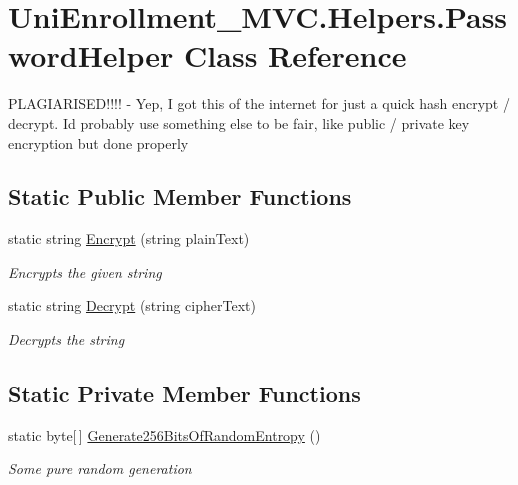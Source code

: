 \hypertarget{class_uni_enrollment___m_v_c_1_1_helpers_1_1_password_helper}{}\section{Uni\+Enrollment\+\_\+\+M\+V\+C.\+Helpers.\+Password\+Helper Class Reference}
\label{class_uni_enrollment___m_v_c_1_1_helpers_1_1_password_helper}


P\+L\+A\+G\+I\+A\+R\+I\+S\+E\+D!!!! -\/ Yep, I got this of the internet for just a quick hash encrypt / decrypt. I\textquotesingle{}d probably use something else to be fair, like public / private key encryption but done properly  


\subsection*{Static Public Member Functions}
\begin{DoxyCompactItemize}
\item 
static string \hyperlink{class_uni_enrollment___m_v_c_1_1_helpers_1_1_password_helper_a154520837901c0ba725be0d3ae4b5307}{Encrypt} (string plain\+Text)
\begin{DoxyCompactList}\small\item\em Encrypts the given string \end{DoxyCompactList}\item 
static string \hyperlink{class_uni_enrollment___m_v_c_1_1_helpers_1_1_password_helper_ad8788f8201903ddd605ad6117ad79e98}{Decrypt} (string cipher\+Text)
\begin{DoxyCompactList}\small\item\em Decrypts the string \end{DoxyCompactList}\end{DoxyCompactItemize}
\subsection*{Static Private Member Functions}
\begin{DoxyCompactItemize}
\item 
static byte\mbox{[}$\,$\mbox{]} \hyperlink{class_uni_enrollment___m_v_c_1_1_helpers_1_1_password_helper_aea04bab899f5ca73b5b7ba3e04c9a937}{Generate256\+Bits\+Of\+Random\+Entropy} ()
\begin{DoxyCompactList}\small\item\em Some pure random generation \end{DoxyCompactList}\end{DoxyCompactItemize}
